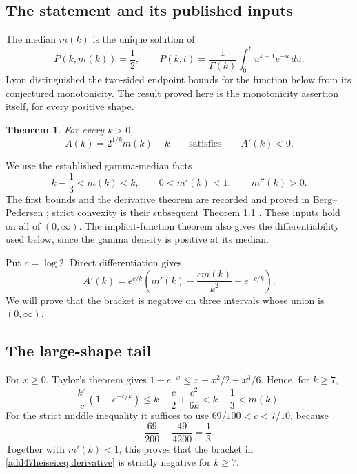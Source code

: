 \documentclass[11pt,a4paper]{article}
\numberwithin{equation}{section}
\newtheorem{theorem}{Theorem}[section]
\theoremstyle{definition}
\theoremstyle{remark}
\begin{document}
\subsection{The statement and its published inputs}
The median $m(k)$ is the unique solution of
\[
 P(k,m(k))=\frac12,\qquad
 P(k,t)=\frac1{\Gamma(k)}\int_0^t u^{k-1}e^{-u}\,du.
\]
Lyon \cite[``Theorems to prove'']{add47heisei:lyon} distinguished the two-sided
endpoint bounds for the function below from its conjectured monotonicity.
The result proved here is the monotonicity assertion itself, for every
positive shape.
\begin{theorem}\label{add47heisei:thm:global}
For every $k>0$,
\[
 A(k)=2^{1/k}m(k)-k\qquad\text{satisfies}\qquad A'(k)<0.
\]
\end{theorem}
We use the established gamma-median facts
\begin{equation}\label{add47heisei:eq:known}
 k-\frac13<m(k)<k,\qquad 0<m'(k)<1,\qquad m''(k)>0.
\end{equation}
The first bounds and the derivative theorem are recorded and proved in
Berg--Pedersen \cite[Introduction and Theorem 3.3]{add47heisei:bp1}; strict convexity
is their subsequent Theorem 1.1 \cite{add47heisei:bp2}. These inputs hold on all of
$(0,\infty)$. The implicit-function theorem also gives the differentiability
used below, since the gamma density is positive at its median.

Put $c=\log 2$. Direct differentiation gives
\begin{equation}\label{add47heisei:eq:derivative}
 A'(k)=e^{c/k}
 \left(m'(k)-\frac{cm(k)}{k^2}-e^{-c/k}\right).
\end{equation}
We will prove that the bracket is negative on three intervals whose union
is $(0,\infty)$.

\subsection{The large-shape tail}
For $x\ge0$, Taylor's theorem gives
$1-e^{-x}\le x-x^2/2+x^3/6$. Hence, for $k\ge7$,
\[
 \frac{k^2}{c}(1-e^{-c/k})
 \le k-\frac c2+\frac{c^2}{6k}
 <k-\frac13<m(k).
\]
For the strict middle inequality it suffices to use
$69/100<c<7/10$, because
\[
 \frac{69}{200}-\frac{49}{4200}=\frac13.
\]
Together with $m'(k)<1$, this proves that the bracket in
\eqref{add47heisei:eq:derivative} is strictly negative for $k\ge7$.
\end{document}
